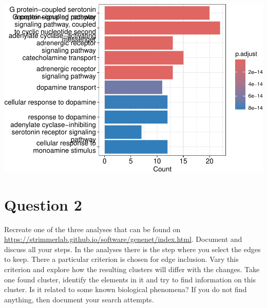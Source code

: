 \documentclass[
]{article}
\begin{document}
\includegraphics{lab5bio_files/figure-latex/sec_com-1.pdf}

\section{Question 2}\label{question-2}

Recreate one of the three analyses that can be found on
\url{https://strimmerlab.github.io/software/genenet/index.html}.
Document and discuss all your steps. In the analyses there is the step
where you select the edges to keep. There a particular criterion is
chosen for edge inclusion. Vary this criterion and explore how the
resulting clusters will differ with the changes. Take one found cluster,
identify the elements in it and try to find information on this cluster.
Is it related to some known biological phenomena? If you do not find
anything, then document your search attempts.
\end{document}
